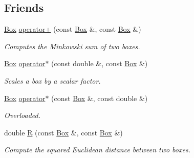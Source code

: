 \subsection*{Friends}
\begin{DoxyCompactItemize}
\item 
\hypertarget{class_box_a000f946af88eafb9880242a0aa8afbd4}{
\hyperlink{class_box}{Box} \hyperlink{class_box_a000f946af88eafb9880242a0aa8afbd4}{operator+} (const \hyperlink{class_box}{Box} \&, const \hyperlink{class_box}{Box} \&)}
\label{class_box_a000f946af88eafb9880242a0aa8afbd4}

\begin{DoxyCompactList}\small\item\em Computes the Minkowski sum of two boxes. \item\end{DoxyCompactList}\item 
\hypertarget{class_box_a63c726eee68a94c84db3e257a9010275}{
\hyperlink{class_box}{Box} \hyperlink{class_box_a63c726eee68a94c84db3e257a9010275}{operator$\ast$} (const double \&, const \hyperlink{class_box}{Box} \&)}
\label{class_box_a63c726eee68a94c84db3e257a9010275}

\begin{DoxyCompactList}\small\item\em Scales a box by a scalar factor. \item\end{DoxyCompactList}\item 
\hypertarget{class_box_ab4993d84958c941ab10bacb6014003ca}{
\hyperlink{class_box}{Box} \hyperlink{class_box_ab4993d84958c941ab10bacb6014003ca}{operator$\ast$} (const \hyperlink{class_box}{Box} \&, const double \&)}
\label{class_box_ab4993d84958c941ab10bacb6014003ca}

\begin{DoxyCompactList}\small\item\em Overloaded. \item\end{DoxyCompactList}\item 
double \hyperlink{class_box_af5dd03ec48233c58649fd2227f3c2d1d}{R} (const \hyperlink{class_box}{Box} \&, const \hyperlink{class_box}{Box} \&)
\begin{DoxyCompactList}\small\item\em Compute the squared Euclidean distance between two boxes. \item\end{DoxyCompactList}\end{DoxyCompactItemize}


